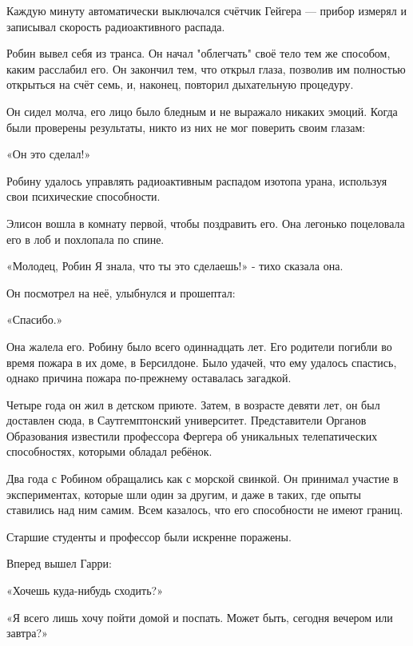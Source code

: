 \documentclass[a4paper,12pt]{book}
\begin{document}
\par
Каждую минуту автоматически выключался счётчик Гейгера — прибор измерял и записывал скорость радиоактивного распада.\\
\par
Робин вывел себя из транса. Он начал "облегчать" своё тело тем же способом, каким расслабил его. Он закончил тем, что открыл глаза, позволив им полностью открыться на счёт семь, и, наконец, повторил дыхательную процедуру.
\par
Он сидел молча, его лицо было бледным и не выражало никаких эмоций. Когда были проверены результаты, никто из них не мог поверить своим глазам:\\
\par
«Он это сделал!»\\
\par
Робину удалось управлять радиоактивным распадом изотопа урана, используя свои психические способности.
\par
Элисон вошла в комнату первой, чтобы поздравить его. Она легонько поцеловала его в лоб и похлопала по спине.
\par
«Молодец, Робин Я знала, что ты это сделаешь!» - тихо сказала она.\\
\par
Он посмотрел на неё, улыбнулся и прошептал:
\par
«Спасибо.»
\par
Она жалела его. Робину было всего одиннадцать лет. Его родители погибли во время пожара в их доме, в Берсилдоне. Было удачей, что ему удалось спастись, однако причина пожара по-прежнему оставалась загадкой.
\par
Четыре года он жил в детском приюте. Затем, в возрасте девяти лет, он был доставлен сюда, в Саутгемптонский университет. Представители Органов Образования известили профессора Фергера об уникальных телепатических способностях, которыми обладал ребёнок.
\par
Два года с Робином обращались как с морской свинкой. Он принимал участие в экспериментах, которые шли один за другим, и даже в таких, где опыты ставились над ним самим. Всем казалось, что его способности не имеют границ.\\
\par
Старшие студенты и профессор были искренне поражены.
\par
Вперед вышел Гарри:
\par
«Хочешь куда-нибудь сходить?»
\par
«Я всего лишь хочу пойти домой и поспать. Может быть, сегодня вечером или завтра?»
\end{document}
